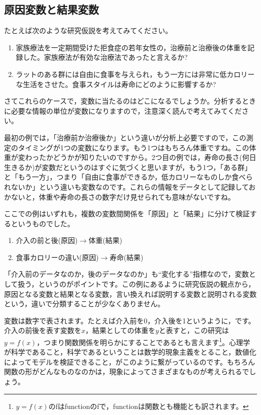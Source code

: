 \documentclass{ltjsbook}
\begin{document}
\subsection{原因変数と結果変数}
たとえば次のような研究仮説を考えてみてください。
\begin{enumerate}
	\item 家族療法を一定期間受けた拒食症の若年女性の，治療前と治療後の体重を記録した。家族療法が有効な治療法であったと言えるか?
	\item ラットのある群には自由に食事を与えられ，もう一方には非常に低カロリーな生活をさせた。食事スタイルは寿命にどのように影響するか?
\end{enumerate}
さてこれらのケースで，変数に当たるのはどこになるでしょうか。分析するときに必要な情報の単位が変数になりますので，注意深く読んで考えてみてください。

最初の例では，「治療前か治療後か」という違いが分析上必要ですので，この測定のタイミングが1つの変数になります。もう1つはもちろん体重ですね。この体重が変わったかどうかが知りたいのですから。2つ目の例では，寿命の長さ(何日生きるか)が変数だというのはすぐに気づくと思いますが，もう1つ，「ある群」と「もう一方」，つまり「自由に食事ができるか，低カロリーなものしか食べられないか」という違いも変数なのです。これらの情報をデータとして記録しておかないと，体重や寿命の長さの数字だけ見せられても意味がないですね。

ここでの例はいずれも，複数の変数間関係を「原因」と「結果」に分けて検証するというものでした。
\begin{enumerate}
	\item 介入の前と後(原因)$\to$体重(結果)
	\item 食事カロリーの違い(原因)$\to$寿命(結果)
\end{enumerate}
「介入前のデータなのか，後のデータなのか」も``変化する''指標なので，変数として扱う，というのがポイントです。この例にあるように研究仮説の観点から，原因となる変数と結果となる変数，言い換えれば説明する変数と説明される変数という，違いで分類することが少なくありません。

変数は数字で表されます。たとえば介入前を0，介入後を1というように，です。介入の前後を表す変数を$x$，結果としての体重を$y$と表すと，この研究は$y=f(x)$，つまり関数関係を明らかにすることであるとも言えます\footnote{$y=f(x)$のfはfunctionのfで，functionは関数とも機能とも訳されます。}。心理学が科学であること，科学であるということは数学的現象主義をとること，数値化によってモデルを検証できること，がこのように繋がっているのです。もちろん関数の形がどんなものなのかは，現象によってさまざまなものが考えられるでしょう。
\end{document}
